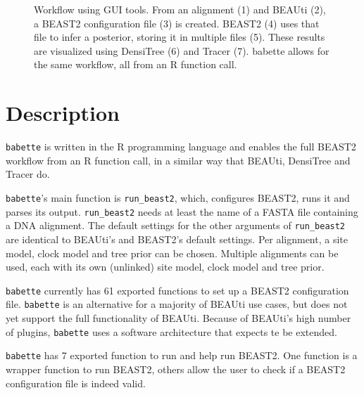 \documentclass{article}
\begin{document}
\begin{figure}
{
  }
  \caption{
    Workflow using GUI tools. From an alignment (1) and BEAUti (2), 
    a BEAST2 configuration file (3) is created. BEAST2 (4) uses that file
    to infer a posterior, storing it in multiple files (5). These results
    are visualized using DensiTree (6) and Tracer (7). babette allows
    for the same workflow, all from an R function call.
  }
  \label{fig:workflow}
\end{figure}

\section{Description}

\verb;babette; is written in the R programming language \cite{R}
and enables the full BEAST2 workflow from an R function call,
in a similar way that BEAUti, DensiTree and Tracer do.

\verb;babette;'s main function is \verb;run_beast2;, which, 
configures BEAST2, runs it and parses its output. 
\verb;run_beast2; needs at least the name of a 
FASTA file containing a DNA alignment. 
The default settings for the other arguments of \verb;run_beast2; 
are identical to BEAUti's and BEAST2's default settings.
Per alignment, a site model, clock model and tree prior can be chosen.
Multiple alignments can be used, each with its own (unlinked) site model, 
clock model and tree prior.

\verb;babette; currently has 61 exported functions to set up  
a BEAST2 configuration file. 
\verb;babette; is an alternative for a majority of BEAUti use cases, 
but does not yet support the full functionality of BEAUti. 
Because of BEAUti's high number of plugins, 
\verb;babette; uses a software architecture that expects te be extended.

\verb;babette; has 7 exported function to run and help run BEAST2.
One function is a wrapper function to run BEAST2, others
allow the user to check if a BEAST2 configuration file is indeed valid.
\end{document}
